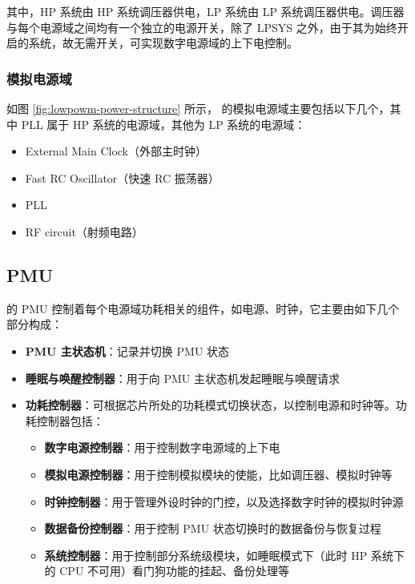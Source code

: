 \documentclass[main\_\_CN.tex]{subfiles}
\begin{document}
其中，HP 系统由 HP 系统调压器供电，LP 系统由 LP 系统调压器供电。调压器与每个电源域之间均有一个独立的电源开关，除了 LPSYS 之外，由于其为始终开启的系统，故无需开关，可实现数字电源域的上下电控制。

\subsubsection{模拟电源域}

如图 \ref{fig:lowpowm-power-structure} 所示，\chipname{} 的模拟电源域主要包括以下几个，其中 PLL 属于 HP 系统的电源域，其他为 LP 系统的电源域：

\begin{itemize}
    \item External Main Clock（外部主时钟）
    \item Fast RC Oscillator（快速 RC 振荡器）
    \item PLL
    \item RF circuit（射频电路）
\end{itemize}

\subsection{PMU}

\chipname{} 的 PMU 控制着每个电源域功耗相关的组件，如电源、时钟，它主要由如下几个部分构成：

\begin{itemize}
    \item \textbf{PMU 主状态机}：记录并切换 PMU 状态
    \item \textbf{睡眠与唤醒控制器}：用于向 PMU 主状态机发起睡眠与唤醒请求
    \item \textbf{功耗控制器}：可根据芯片所处的功耗模式切换状态，以控制电源和时钟等。功耗控制器包括：
        \begin{itemize}
            \item \textbf{数字电源控制器}：用于控制数字电源域的上下电
            \item \textbf{模拟电源控制器}：用于控制模拟模块的使能，比如调压器、模拟时钟等
            \item \textbf{时钟控制器}：用于管理外设时钟的门控，以及选择数字时钟的模拟时钟源
            \item \textbf{数据备份控制器}：用于控制 PMU 状态切换时的数据备份与恢复过程
            \item \textbf{系统控制器}：用于控制部分系统级模块，如睡眠模式下（此时 HP 系统下的 CPU 不可用）看门狗功能的挂起、备份处理等
        \end{itemize}
\end{itemize}
\end{document}

